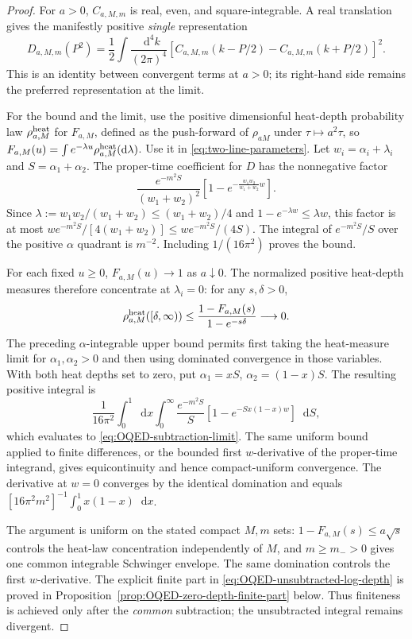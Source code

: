 \documentclass[final,5p,times,twocolumn,numbers,nopreprintline]{elsarticle}
\numberwithin{equation}{section}
\theoremstyle{definition}
\theoremstyle{remark}
\newcommand{\dd}{\mathop{}\!\mathrm d}
\begin{document}
\begin{proof}
For $a>0$, $C_{a,M,m}$ is real, even, and square-integrable.
A real translation gives the manifestly positive \emph{single}
representation
\begin{equation}
 D_{a,M,m}(P^2)=\frac12\int\frac{\dd^4k}{(2\pi)^4}
 [C_{a,M,m}(k-P/2)-C_{a,M,m}(k+P/2)]^2.
 \label{eq:OQED-subtraction-difference-square}
\end{equation}
This is an identity between convergent terms at $a>0$; its
right-hand side remains the preferred representation at the limit.

For the bound and the limit, use the positive dimensionful heat-depth
probability law $\rho^{\rm heat}_{a,M}$ for $F_{a,M}$, defined
as the push-forward of $\rho_{aM}$ under $\tau\mapsto a^2\tau$,
so $F_{a,M}(u)=\int e^{-\lambda u}\rho^{\rm heat}_{a,M}
(\dd\lambda)$. Use it in \eqref{eq:two-line-parameters}. Let
$w_i=\alpha_i+\lambda_i$ and $S=\alpha_1+\alpha_2$.
The proper-time coefficient for $D$ has the nonnegative factor
\[
 \frac{e^{-m^2S}}{(w_1+w_2)^2}
 \left[1-e^{-\frac{w_1w_2}{w_1+w_2}w}\right].
\]
Since $\lambda:=w_1w_2/(w_1+w_2)\leq(w_1+w_2)/4$ and
$1-e^{-\lambda w}\leq\lambda w$, this factor is at most
$w e^{-m^2S}/[4(w_1+w_2)]\leq w e^{-m^2S}/(4S)$.
The integral of $e^{-m^2S}/S$ over the positive $\alpha$ quadrant
is $m^{-2}$. Including $1/(16\pi^2)$ proves the bound.

For each fixed $u\geq0$, $F_{a,M}(u)\to1$ as $a\downarrow0$.
The normalized positive heat-depth measures therefore concentrate at
$\lambda_i=0$: for any $s,\delta>0$,
\[
 \rho^{\rm heat}_{a,M}([\delta,\infty))
 \leq\frac{1-F_{a,M}(s)}{1-e^{-s\delta}}\longrightarrow0.
\]
The preceding $\alpha$-integrable upper bound permits first taking
the heat-measure limit for $\alpha_1,\alpha_2>0$ and then using
dominated convergence in those variables. With both heat depths set
to zero, put $\alpha_1=xS$, $\alpha_2=(1-x)S$. The resulting
positive integral is
\[
 \frac1{16\pi^2}\int_0^1\dd x\int_0^\infty
  \frac{e^{-m^2S}}S
       [1-e^{-Sx(1-x)w}]\dd S,
\]
which evaluates to \eqref{eq:OQED-subtraction-limit}. The same
uniform bound applied to finite differences, or the bounded first
$w$-derivative of the proper-time integrand, gives equicontinuity
and hence compact-uniform convergence. The derivative at $w=0$
converges by the identical domination and equals
$[16\pi^2m^2]^{-1}\int_0^1x(1-x)\dd x$.

The argument is uniform on the stated compact $M,m$ sets:
$1-F_{a,M}(s)\leq a\sqrt{s}$ controls the heat-law
concentration independently of $M$, and $m\geq m_->0$ gives
one common integrable Schwinger envelope. The same domination
controls the first $w$-derivative. The explicit finite part
in \eqref{eq:OQED-unsubtracted-log-depth} is proved in
Proposition~\ref{prop:OQED-zero-depth-finite-part} below.
Thus finiteness is achieved only after the \emph{common}
subtraction; the unsubtracted integral remains divergent.
\end{proof}
\end{document}
